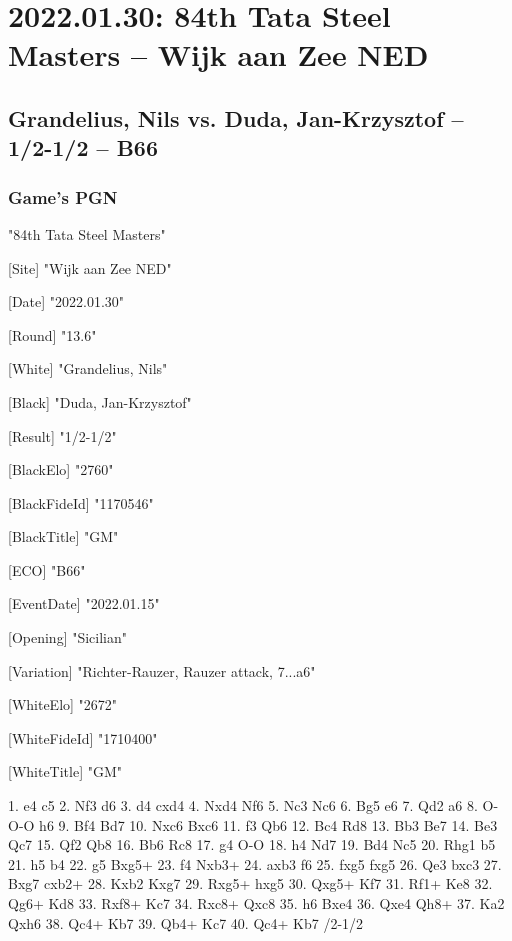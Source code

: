\documentclass[9pt]{extarticle}
\begin{document}
\section*{2022.01.30: 84th Tata Steel Masters -- Wijk aan Zee NED}

\subsection*{Grandelius, Nils vs. Duda, Jan-Krzysztof -- 1/2-1/2 -- B66}
\subsubsection*{Game's PGN}
\begin{flushleft}
[Event] "84th Tata Steel Masters"

[Site] "Wijk aan Zee NED"

[Date] "2022.01.30"

[Round] "13.6"

[White] "Grandelius, Nils"

[Black] "Duda, Jan-Krzysztof"

[Result] "1/2-1/2"

[BlackElo] "2760"

[BlackFideId] "1170546"

[BlackTitle] "GM"

[ECO] "B66"

[EventDate] "2022.01.15"

[Opening] "Sicilian"

[Variation] "Richter-Rauzer, Rauzer attack, 7...a6"

[WhiteElo] "2672"

[WhiteFideId] "1710400"

[WhiteTitle] "GM"

\end{flushleft}
\begin{flushleft}
1. e4 c5 2. Nf3 d6 3. d4 cxd4 4. Nxd4 Nf6 5. Nc3 Nc6 6. Bg5 e6 7. Qd2 a6 8. O-O-O h6 9. Bf4 Bd7 10. Nxc6 Bxc6 11. f3 Qb6 12. Bc4 Rd8 13. Bb3 Be7 14. Be3 Qc7 15. Qf2 Qb8 16. Bb6 Rc8 17. g4 O-O 18. h4 Nd7 19. Bd4 Nc5 20. Rhg1 b5 21. h5 b4 22. g5 Bxg5+ 23. f4 Nxb3+ 24. axb3 f6 25. fxg5 fxg5 26. Qe3 bxc3 27. Bxg7 cxb2+ 28. Kxb2 Kxg7 29. Rxg5+ hxg5 30. Qxg5+ Kf7 31. Rf1+ Ke8 32. Qg6+ Kd8 33. Rxf8+ Kc7 34. Rxc8+ Qxc8 35. h6 Bxe4 36. Qxe4 Qh8+ 37. Ka2 Qxh6 38. Qc4+ Kb7 39. Qb4+ Kc7 40. Qc4+ Kb7 \quad  {}/2-1/2
\end{flushleft}
\parindent 0mm
\end{document}
